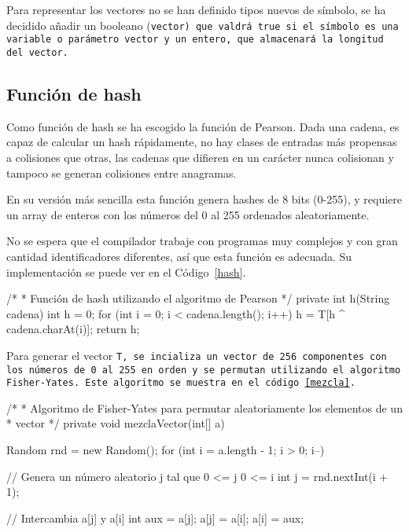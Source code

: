 Para representar los vectores no se han definido tipos nuevos de símbolo, se ha decidido añadir un booleano (\tt{vector}) que valdrá \tt{true} si el símbolo es una variable o parámetro vector y un entero, que almacenará la longitud del vector.

\subsection{Función de hash}
Como función de hash se ha escogido la función de Pearson. Dada una cadena, es capaz de calcular un hash rápidamente, no hay clases de entradas más propensas a colisiones que otras, las cadenas que difieren en un carácter nunca colisionan y tampoco se generan colisiones entre anagramas.

En su versión más sencilla esta función genera hashes de 8 bits (0-255), y requiere un array de enteros con los números del 0 al 255 ordenados aleatoriamente.

No se espera que el compilador trabaje con programas muy complejos y con gran cantidad identificadores diferentes, así que esta función es adecuada. Su implementación se puede ver en el Código~\ref{hash}.

\begin{codigo}[style=java,caption={Función \url{lib.semantico.TablaSimbolos.h}.},label={hash}]
/*
 * Función de hash utilizando el algoritmo de Pearson
 */
private int h(String cadena) {
    int h = 0;
    for (int i = 0; i < cadena.length(); i++) {
        h = T[h ^ cadena.charAt(i)];
    }
    return h;
}
\end{codigo}

Para generar el vector \tt{T}, se incializa un vector de 256 componentes con los números de 0 al 255 en orden y se permutan utilizando el algoritmo Fisher-Yates. Este algoritmo se muestra en el código~\ref{mezcla}.

\begin{codigo}[style=java,caption={Función \url{lib.semantico.TablaSimbolos.mezclaVector}.},label={mezcla}]
/*
 * Algoritmo de Fisher-Yates para permutar aleatoriamente los elementos de un
 * vector
 */
private void mezclaVector(int[] a) {
    Random rnd = new Random();
    for (int i = a.length - 1; i > 0; i--) {
        // Genera un número aleatorio j tal que 0 <= j 0 <= i
        int j = rnd.nextInt(i + 1);

        // Intercambia a[j] y a[i]
        int aux = a[j];
        a[j] = a[i];
        a[i] = aux;
    }
}
\end{codigo}


